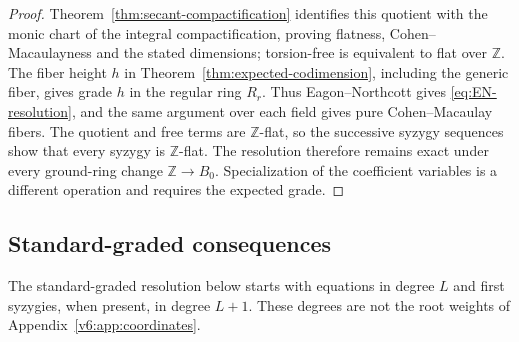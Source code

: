 \documentclass[10pt,fleqn]{article}
\numberwithin{equation}{section}
\begin{document}
\begin{proof}
Theorem~\ref{thm:secant-compactification} identifies this quotient
with the monic chart of the integral compactification, proving
flatness, Cohen--Macaulayness and the stated dimensions; torsion-free
is equivalent to flat over $\mathbb Z$.
The fiber height $h$ in Theorem~\ref{thm:expected-codimension},
including the generic fiber, gives grade $h$ in the regular ring
$R_r$.  Thus Eagon--Northcott gives \eqref{eq:EN-resolution}, and
the same argument over each field gives pure Cohen--Macaulay fibers.
The quotient and free terms are $\mathbb Z$-flat, so the successive
syzygy sequences show that every syzygy is $\mathbb Z$-flat.
The resolution therefore remains exact under every ground-ring
change $\mathbb Z\to B_0$.  Specialization of the coefficient
variables is a different operation and requires the expected grade.
\end{proof}


\subsection{Standard-graded consequences}
\label{r18:sec:standard-postulation}
The standard-graded resolution below starts with equations in degree
$L$ and first syzygies, when present, in degree $L+1$.
These degrees are not the root weights of Appendix~\ref{v6:app:coordinates}.
\end{document}
